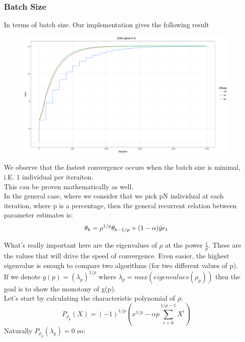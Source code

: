 \documentclass[a4paper]{article}
\theoremstyle{plain}
\theoremstyle{plain}
\theoremstyle{definition}
\begin{document}
\subsubsection{Batch Size}
In terms of batch size. Our implementation gives the following result
\begin{figure}[H]
\begin{center}
\includegraphics[scale=0.3]{iem_batch.pdf}
\end{center}
\end{figure}

We observe that the fastest convergence occurs when the batch size is minimal, i.E. $1$ individual per iteraiton.\\
This can be proven mathematically as well.\\
In the general case, where we consider that we pick pN individual at each iteration, where p is a percentage, then the general recurrent relation between parameter estimates is:
\begin{equation}
\theta_k = \rho^{1/p} \theta_{k-1/p} + (1-\alpha) \bar{y} e_1 \\
\end{equation}

What's really important here are the eigenvalues of $\rho$ at the power $\frac{1}{p}$. These are the values that will drive the speed of convergence. Even easier, the highest eigenvalue is enough to compare two algorithms (for two different values of p).\\
If we denote $g(p) = (\lambda_p)^{1/p}$ where $\lambda_p = max(eigenvalues(\rho_p))$ then the goal is to show the monotony of g(p).\\
Let's start by calculating the characteristic polynomial of $\rho$:
\begin{equation}
P_{\rho_p}(X) = (-1)^{1/p}(x^{1/p} - \alpha p \sum_{i=0}^{1/p-1}{X^i})
\end{equation}
Naturally $P_{\rho_p}(\lambda_p) = 0$ so:
\end{document}
